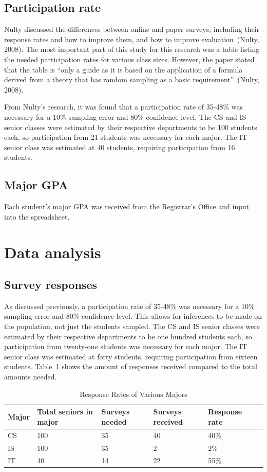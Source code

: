 \subsection{Participation rate}
Nulty discussed the differences between online and paper surveys, including their response rates and how to improve them, and how to improve evaluation~(Nulty, 2008). The most important part of this study for this research was a table listing the needed participation rates for various class sizes. However, the paper stated that the table is ``only a guide as it is based on the application of a formula derived from a theory that has random sampling as a basic requirement''~(Nulty, 2008).

From Nulty's research, it was found that a participation rate of 35-48\% was necessary for a 10\% sampling error and 80\% confidence level. The CS and IS senior classes were estimated by their respective departments to be 100 students each, so participation from 21 students was necessary for each major. The IT senior class was estimated at 40 students, requiring participation from 16 students.

\subsection{Major GPA}
Each student's major GPA was received from the Registrar's Office and input into the spreadsheet.

\section{Data analysis}
\subsection{Survey responses}
As discussed previously, a participation rate of 35-48\% was necessary for a 10\% sampling error and 80\% confidence level. This allows for inferences to be made on the population, not just the students sampled. The CS and IS senior classes were estimated by their respective departments to be one hundred students each, so participation from twenty-one students was necessary for each major. The IT senior class was estimated at forty students, requiring participation from sixteen students. Table~\ref{tab:c-response-rates} shows the amount of responses received compared to the total amounts needed.

\begin{table}[h!]
  \centering
  \caption{Response Rates of Various Majors}
  \label{tab:c-response-rates}
  \begin{tabular}{llllll}
    \toprule
    Major & Total seniors in major & Surveys needed & Surveys received & Response rate\\
    \midrule
    CS    & 100                    & 35             & 40               & 40\%\\
    IS    & 100                    & 35             & 2                & 2\%\\
    IT    & 40                     & 14             & 22               & 55\%\\
    \bottomrule
  \end{tabular}
\end{table}

